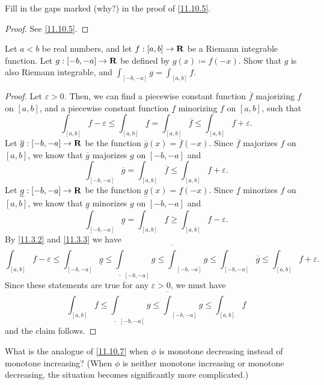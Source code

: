 \begin{exercise}\label{ex 11.10.2}
  Fill in the gaps marked (why?) in the proof of \cref{11.10.5}.
\end{exercise}

\begin{proof}
  See \cref{11.10.5}.
\end{proof}

\begin{exercise}\label{ex 11.10.3}
  Let \(a < b\) be real numbers, and let \(f : [a, b] \to \mathbf{R}\) be a Riemann integrable function.
  Let \(g : [-b, -a] \to \mathbf{R}\) be defined by \(g(x) \coloneqq f(-x)\).
  Show that \(g\) is also Riemann integrable, and \(\int_{[-b, -a]} g = \int_{[a, b]} f\).
\end{exercise}

\begin{proof}
  Let \(\varepsilon > 0\).
  Then, we can find a piecewise constant function \(\overline{f}\) majorizing \(f\) on \([a, b]\), and a piecewise constant function \(\underline{f}\) minorizing \(f\) on \([a, b]\), such that
  \[
    \int_{[a, b]} f - \varepsilon \leq \int_{[a, b]} \underline{f} = \int_{[a, b]} \overline{f} \leq \int_{[a, b]} f + \varepsilon.
  \]
  Let \(\overline{g} : [-b, -a] \to \mathbf{R}\) be the function \(\overline{g}(x) = \overline{f}(-x)\).
  Since \(\overline{f}\) majorizes \(f\) on \([a, b]\), we know that \(\overline{g}\) majorizes \(g\) on \([-b, -a]\) and
  \[
    \int_{[-b, -a]} \overline{g} = \int_{[a, b]} \overline{f} \leq \int_{[a, b]} f + \varepsilon.
  \]
  Let \(\underline{g} : [-b, -a] \to \mathbf{R}\) be the function \(\underline{g}(x) = \underline{f}(-x)\).
  Since \(\underline{f}\) minorizes \(f\) on \([a, b]\), we know that \(\underline{g}\) minorizes \(g\) on \([-b, -a]\) and
  \[
    \int_{[-b, -a]} \underline{g} = \int_{[a, b]} \underline{f} \geq \int_{[a, b]} f - \varepsilon.
  \]
  By \cref{11.3.2} and \cref{11.3.3} we have
  \[
    \int_{[a, b]} f - \varepsilon \leq \int_{[-b, -a]} \underline{g} \leq \underline{\int}_{[-b, -a]} g \leq \overline{\int}_{[-b, -a]} g \leq \int_{[-b, -a]} \overline{g} \leq \int_{[a, b]} f + \varepsilon.
  \]
  Since these statements are true for any \(\varepsilon > 0\), we must have
  \[
    \int_{[a, b]} f \leq \underline{\int}_{[-b, -a]} g \leq \overline{\int}_{[-b, -a]} g \leq \int_{[a, b]} f
  \]
  and the claim follows.
\end{proof}

\begin{exercise}\label{ex 11.10.4}
  What is the analogue of \cref{11.10.7} when \(\phi\) is monotone decreasing instead of monotone increasing?
  (When \(\phi\) is neither monotone increasing or monotone decreasing, the situation becomes significantly more complicated.)
\end{exercise}

